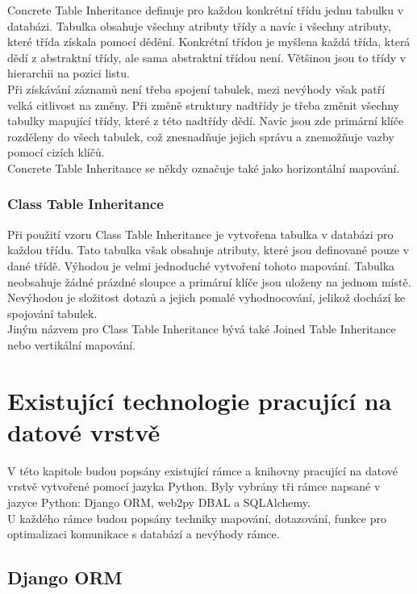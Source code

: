 \documentclass[ing,male,java,dept456]{diploma}						%
\begin{document}
Concrete Table Inheritance definuje pro každou konkrétní třídu jednu tabulku v databázi. Tabulka obsahuje všechny atributy třídy a navíc i všechny atributy, které třída získala pomocí dědění. Konkrétní třídou je myšlena každá třída, která dědí z abstraktní třídy, ale sama abstraktní třídou není. Většinou jsou to třídy v hierarchii na pozici listu. \\
Při získávání záznamů není třeba spojení tabulek, mezi nevýhody však patří velká citlivost na změny. Při změně struktury nadtřídy je třeba změnit všechny tabulky mapující třídy, které z této nadtřídy dědí. Navíc jsou zde primární klíče rozděleny do všech tabulek, což znesnadňuje jejich správu a znemožňuje vazby pomocí cizích klíčů. \\
Concrete Table Inheritance se někdy označuje také jako horizontální mapování.

\subsubsection{Class Table Inheritance}

Při použití vzoru Class Table Inheritance je vytvořena tabulka v databázi pro každou třídu. Tato tabulka však obsahuje atributy, které jsou definované pouze v dané třídě. Výhodou je velmi jednoduché vytvoření tohoto mapování. Tabulka neobsahuje žádné prázdné sloupce a primární klíče jsou uloženy na jednom místě. Nevýhodou je složitost dotazů a jejich pomalé vyhodnocování, jelikož dochází ke spojování tabulek.  \\
Jiným názvem pro Class Table Inheritance bývá také Joined Table Inheritance nebo vertikální mapování.

\section{Existující technologie pracující na datové vrstvě}
\label{sec:Comparison}

V této kapitole budou popsány existující rámce a knihovny pracující na datové vrstvě vytvořené pomocí jazyka Python. Byly vybrány tři rámce napsané v jazyce Python: Django ORM, web2py DBAL a SQLAlchemy. \\
U každého rámce budou popsány techniky mapování, dotazování, funkce pro optimalizaci komunikace s databází a nevýhody rámce.

\subsection{Django ORM}
\end{document}
